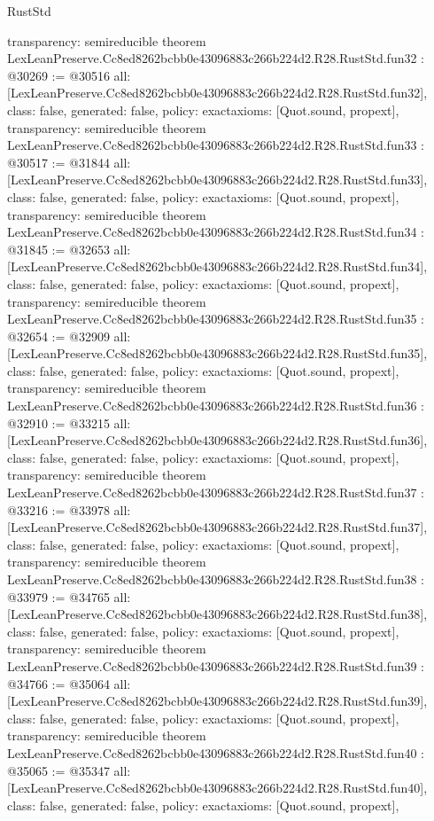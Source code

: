 \begin{lexlean}{RustStd}
\begin{coremodule}
{  transparency: semireducible
}
theorem LexLeanPreserve.Cc8ed8262bcbb0e43096883c266b224d2.R28.RustStd.fun32 : @30269 := @30516 {
  all: [LexLeanPreserve.Cc8ed8262bcbb0e43096883c266b224d2.R28.RustStd.fun32],
  class: false,
  generated: false,
  policy: exact{axioms: [Quot.sound, propext]},
  transparency: semireducible
}
theorem LexLeanPreserve.Cc8ed8262bcbb0e43096883c266b224d2.R28.RustStd.fun33 : @30517 := @31844 {
  all: [LexLeanPreserve.Cc8ed8262bcbb0e43096883c266b224d2.R28.RustStd.fun33],
  class: false,
  generated: false,
  policy: exact{axioms: [Quot.sound, propext]},
  transparency: semireducible
}
theorem LexLeanPreserve.Cc8ed8262bcbb0e43096883c266b224d2.R28.RustStd.fun34 : @31845 := @32653 {
  all: [LexLeanPreserve.Cc8ed8262bcbb0e43096883c266b224d2.R28.RustStd.fun34],
  class: false,
  generated: false,
  policy: exact{axioms: [Quot.sound, propext]},
  transparency: semireducible
}
theorem LexLeanPreserve.Cc8ed8262bcbb0e43096883c266b224d2.R28.RustStd.fun35 : @32654 := @32909 {
  all: [LexLeanPreserve.Cc8ed8262bcbb0e43096883c266b224d2.R28.RustStd.fun35],
  class: false,
  generated: false,
  policy: exact{axioms: [Quot.sound, propext]},
  transparency: semireducible
}
theorem LexLeanPreserve.Cc8ed8262bcbb0e43096883c266b224d2.R28.RustStd.fun36 : @32910 := @33215 {
  all: [LexLeanPreserve.Cc8ed8262bcbb0e43096883c266b224d2.R28.RustStd.fun36],
  class: false,
  generated: false,
  policy: exact{axioms: [Quot.sound, propext]},
  transparency: semireducible
}
theorem LexLeanPreserve.Cc8ed8262bcbb0e43096883c266b224d2.R28.RustStd.fun37 : @33216 := @33978 {
  all: [LexLeanPreserve.Cc8ed8262bcbb0e43096883c266b224d2.R28.RustStd.fun37],
  class: false,
  generated: false,
  policy: exact{axioms: [Quot.sound, propext]},
  transparency: semireducible
}
theorem LexLeanPreserve.Cc8ed8262bcbb0e43096883c266b224d2.R28.RustStd.fun38 : @33979 := @34765 {
  all: [LexLeanPreserve.Cc8ed8262bcbb0e43096883c266b224d2.R28.RustStd.fun38],
  class: false,
  generated: false,
  policy: exact{axioms: [Quot.sound, propext]},
  transparency: semireducible
}
theorem LexLeanPreserve.Cc8ed8262bcbb0e43096883c266b224d2.R28.RustStd.fun39 : @34766 := @35064 {
  all: [LexLeanPreserve.Cc8ed8262bcbb0e43096883c266b224d2.R28.RustStd.fun39],
  class: false,
  generated: false,
  policy: exact{axioms: [Quot.sound, propext]},
  transparency: semireducible
}
theorem LexLeanPreserve.Cc8ed8262bcbb0e43096883c266b224d2.R28.RustStd.fun40 : @35065 := @35347 {
  all: [LexLeanPreserve.Cc8ed8262bcbb0e43096883c266b224d2.R28.RustStd.fun40],
  class: false,
  generated: false,
  policy: exact{axioms: [Quot.sound, propext]},
}
\end{coremodule}
\end{lexlean}
